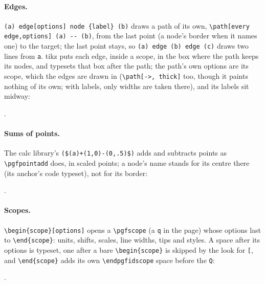 \documentclass{article}
\numberwithin{equation}{section}
\theoremstyle{definition}
\theoremstyle{remark}
\begin{document}
\paragraph{Edges.} \verb|(a) edge[options] node {label} (b)| draws a path of its own,
\verb|\path[every edge,options] (a) -- (b)|, from the last point (a node's border when it
names one) to the target; the last point stays, so \verb|(a) edge (b) edge (c)| draws two
lines from \verb|a|. tikz puts each edge, inside a scope, in the box where the path keeps
its nodes, and typesets that box after the path; the path's own options are its scope,
which the edges are drawn in (\verb|\path[->, thick]| too, though it paints nothing of its
own; with labels, only widths are taken there), and its labels sit midway:
.

\paragraph{Sums of points.} The calc library's \verb|($(a)+(1,0)-(0,.5)$)| adds and
subtracts points as \verb|\pgfpointadd| does, in scaled points; a node's name stands for
its centre there (its anchor's code typeset), not for its border:
.

\paragraph{Scopes.} \verb|\begin{scope}[options]| opens a \verb|\pgfscope| (a \verb|q|
in the page) whose options last to \verb|\end{scope}|: units, shifts, scales, line widths,
tips and styles. A space after its options is typeset, one after a bare
\verb|\begin{scope}| is skipped by the look for \verb|[|, and \verb|\end{scope}| adds its
own \verb|\endpgfidscope| space before the \verb|Q|:
.
\end{document}
